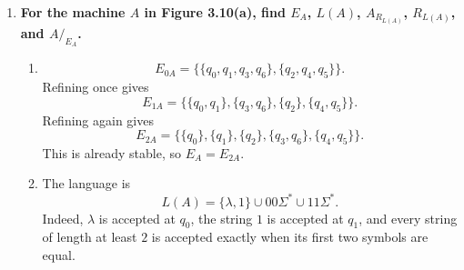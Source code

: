 \begin{enumerate}[{3.}1.]
\begin{enumerate}
\item \textit{Well-defined}: this is defined everywhere on $S^c$ because, by definition of the connected part, each $s\in S^c$ has at least one string reaching it. If $x$ and $y$ both satisfy
\[
\DBAR(s_0,x)=\DBAR(s_0,y)=s,
\]
then by definition of $R^M$ we have $x R^M y$. Hence
\[
[x]_{R^M}=[y]_{R^M},
\]
so $\psi(s)$ does not depend on which string reaching $s$ was chosen.

\item \textit{Homomorphism}: first,
\[
\psi(s_0)=[\lambda]_{R^M},
\]
because $\lambda$ reaches $s_0$. Now let $s\in S^c$ and $a\in\Sigma$. Since
\[
\DBAR(s_0,x_sa)=\delta(\DBAR(s_0,x_s),a)=\delta(s,a),
\]
the string $x_sa$ reaches $\delta(s,a)$, so
\[
\psi(\delta(s,a))=[x_sa]_{R^M}
=\delta_{R^M}([x_s]_{R^M},a)
=\delta_{R^M}(\psi(s),a).
\]
Also,
\[
s\in F
\Leftrightarrow \DBAR(s_0,x_s)\in F
\Leftrightarrow x_s\in L(M)
\Leftrightarrow [x_s]_{R^M}\in F_{R^M}
\Leftrightarrow \psi(s)\in F_{R^M}.
\]
Thus $\psi$ preserves start state, transitions, and finality.

\item \textit{Bijection}: to show injectivity, suppose $\psi(s)=\psi(t)$. Then
\[
[x_s]_{R^M}=[x_t]_{R^M},
\]
so $x_s R^M x_t$. By definition of $R^M$,
\[
\DBAR(s_0,x_s)=\DBAR(s_0,x_t),
\]
hence $s=t$. For surjectivity, let $[x]_{R^M}$ be any state of $A_{R^M}$.
Then
\[
s=\DBAR(s_0,x)\in S^c,
\]
and by definition of $\psi$,
\[
\psi(s)=[x]_{R^M}.
\]

\item $M^c\cong A_{R^M}$. $\square$
\end{enumerate}

\item \textbf{For the machine $A$ in Figure 3.10(a), find $E_A$, $L(A)$, $A_{R_{L(A)}}$, $R_{L(A)}$, and $A/_{E_A}$.}

\begin{enumerate}
\item
\[
E_{0A}=\{\{q_0,q_1,q_3,q_6\},\{q_2,q_4,q_5\}\}.
\]
Refining once gives
\[
E_{1A}=\{\{q_0,q_1\},\{q_3,q_6\},\{q_2\},\{q_4,q_5\}\}.
\]
Refining again gives
\[
E_{2A}=\{\{q_0\},\{q_1\},\{q_2\},\{q_3,q_6\},\{q_4,q_5\}\}.
\]
This is already stable, so $E_A=E_{2A}$.

\item The language is
\[
L(A)=\{\lambda,1\}\cup 00\Sigma^* \cup 11\Sigma^*.
\]
Indeed, $\lambda$ is accepted at $q_0$, the string $1$ is accepted at $q_1$,
and every string of length at least $2$ is accepted exactly when its first two
symbols are equal.


\end{enumerate}
\end{enumerate}
